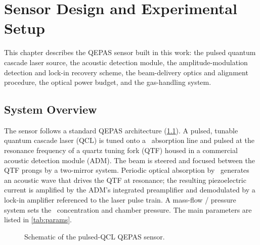 \chapter{Sensor Design and Experimental Setup}
\label{ch:methodology}

This chapter describes the QEPAS sensor built in this work: the pulsed quantum
cascade laser source, the acoustic detection module, the amplitude-modulation
detection and lock-in recovery scheme, the beam-delivery optics and alignment
procedure, the optical power budget, and the gas-handling system.

\section{System Overview}
\label{sec:system}

The sensor follows a standard QEPAS architecture (\cref{fig:setup}). A pulsed,
tunable quantum cascade laser (QCL) is tuned onto a \nto\ absorption line and
pulsed at the resonance frequency of a quartz tuning fork (QTF) housed in a
commercial acoustic detection module (ADM). The beam is steered and focused
between the QTF prongs by a two-mirror system. Periodic optical absorption by
\nto\ generates an acoustic wave that drives the QTF at resonance; the resulting
piezoelectric current is amplified by the ADM's integrated preamplifier and
demodulated by a lock-in amplifier referenced to the laser pulse train. A
mass-flow / pressure system sets the \nto\ concentration and chamber pressure.
The main parameters are listed in \cref{tab:params}.

\begin{figure}[H]
  \centering
  \caption{Schematic of the pulsed-QCL QEPAS sensor.}
  \label{fig:setup}
\end{figure}


